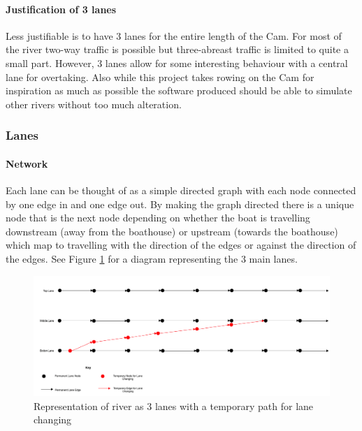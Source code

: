       \paragraph{Justification of 3 lanes}
      Less justifiable is to have 3 lanes for the entire length of the Cam. For most of the river two-way traffic is possible but three-abreast traffic is limited to quite a small part. However, 3 lanes allow for some interesting behaviour with a central lane for overtaking. Also while this project takes rowing on the Cam for inspiration as much as possible the software produced should be able to simulate other rivers without too much alteration.
      
      \subsubsection{Lanes}
      \paragraph{Network}
      Each lane can be thought of as a simple directed graph with each node connected by one edge in and one edge out. By making the graph directed there is a unique node that is the next node depending on whether the boat is travelling downstream (away from the boathouse) or upstream (towards the boathouse) which map to travelling with the direction of the edges or against the direction of the edges. See Figure \ref{fig:model:lanes} for a diagram representing the 3 main lanes.
      
      \begin{figure}[h]
      \begin{center}
      	\includegraphics[scale=0.3]{images/lanes.png}
      	\caption{Representation of river as 3 lanes with a temporary path for lane changing}
      	\label{fig:model:lanes}
      \end{center}
      \end{figure}
      
